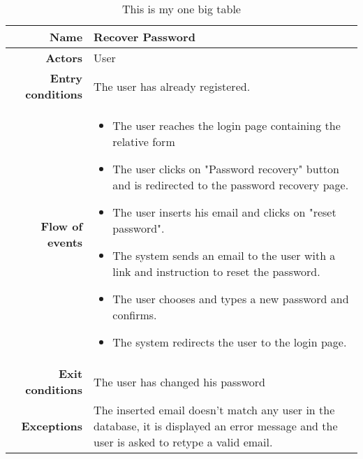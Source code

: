 \begin{table}
\begin{tabular}{r|p{7cm}}
\bf\large Name&\bf\large Recover Password \\
\hline
\hline
\bf Actors&User\\
\hline
\bf Entry conditions&The user has already registered.\\
\hline
\bf Flow of events&
\begin{itemize}
\item The user reaches the login page containing the relative form
\item The user clicks on "Password recovery" button and is redirected to the password recovery page.
\item The user inserts his email and clicks on "reset password".
\item The system sends an email to the user with a link and instruction to reset the password.
\item The user chooses and types a new password and confirms.
\item The system redirects the user to the login page.
\end{itemize}
\\
\hline
\bf Exit conditions&The user has changed his password \\
\hline
\bf Exceptions&The inserted email doesn't match any user in the database, it is displayed an error message and the user is asked to retype a valid email.\\
\hline

\end{tabular}
\caption{This is my one big table} \label{tab:recoverpassword}
\end{table}